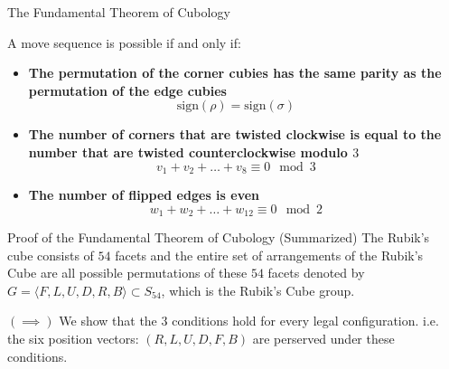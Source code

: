 \documentclass[final]{beamer}
\newlength{\colwidth}
\begin{document}
\begin{frame}[t]
\begin{columns}[t]
\begin{column}{\colwidth}
\end{column}

\begin{column}{\colwidth}

  \begin{alertblock}{The Fundamental Theorem of Cubology}
    
    A move sequence is possible if and only if: 

    \begin{itemize}
      \item \textbf{The permutation of the corner cubies has the same parity as the permutation of the edge cubies} 
      $$\text{sign}(\rho) = \text{sign}(\sigma)$$
      \item \textbf{The number of corners that are twisted clockwise is equal to the number that are twisted counterclockwise modulo $3$}
      $$v_{1} + v_{2} +\dots +v_{8} \equiv 0 \mod 3$$
      \item \textbf{The number of flipped edges is even}
      $$w_{1} + w_{2} +\dots +w_{12} \equiv 0 \mod 2$$
    \end{itemize}


  \end{alertblock}

  \begin{block}{Proof of the Fundamental Theorem of Cubology (Summarized)}
    The Rubik's cube consists of $54$ facets and the entire set of arrangements of the Rubik's Cube are all possible permutations of these $54$ facets 
    denoted  by $G = \langle F,L,U,D,R,B\rangle \subset S_{54}$, which is the Rubik's Cube group.



$(\implies)$ 
We show that the $3$ conditions hold for every legal configuration. i.e. the six position vectors: $(R,L,U,D,F,B)$ are perserved under these conditions.


\end{block}
\end{column}
\end{columns}
\end{frame}
\end{document}
